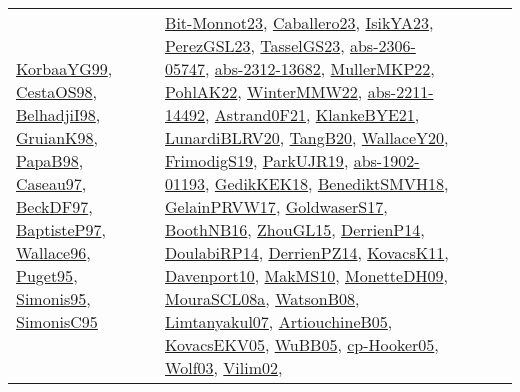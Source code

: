 {\begin{longtable}{lp{3cm}>{\raggedright}p{6cm}>{\raggedright}p{6cm}p{8cm}}
\href{papers/KorbaaYG99.pdf}{KorbaaYG99}\cite{KorbaaYG99}, \href{papers/CestaOS98.pdf}{CestaOS98}\cite{CestaOS98}, \href{articles/BelhadjiI98.pdf}{BelhadjiI98}\cite{BelhadjiI98}, \href{papers/GruianK98.pdf}{GruianK98}\cite{GruianK98}, \href{articles/PapaB98.pdf}{PapaB98}\cite{PapaB98}, \href{papers/Caseau97.pdf}{Caseau97}\cite{Caseau97}, \href{papers/BeckDF97.pdf}{BeckDF97}\cite{BeckDF97}, \href{papers/BaptisteP97.pdf}{BaptisteP97}\cite{BaptisteP97}, \href{articles/Wallace96.pdf}{Wallace96}\cite{Wallace96}, \href{papers/Puget95.pdf}{Puget95}\cite{Puget95}, \href{papers/Simonis95.pdf}{Simonis95}\cite{Simonis95}, \href{papers/SimonisC95.pdf}{SimonisC95}\cite{SimonisC95} & \href{papers/Bit-Monnot23.pdf}{Bit-Monnot23}\cite{Bit-Monnot23}, \href{articles/Caballero23.pdf}{Caballero23}\cite{Caballero23}, \href{articles/IsikYA23.pdf}{IsikYA23}\cite{IsikYA23}, \href{papers/PerezGSL23.pdf}{PerezGSL23}\cite{PerezGSL23}, \href{papers/TasselGS23.pdf}{TasselGS23}\cite{TasselGS23}, \href{articles/abs-2306-05747.pdf}{abs-2306-05747}\cite{abs-2306-05747}, \href{articles/abs-2312-13682.pdf}{abs-2312-13682}\cite{abs-2312-13682}, \href{articles/MullerMKP22.pdf}{MullerMKP22}\cite{MullerMKP22}, \href{articles/PohlAK22.pdf}{PohlAK22}\cite{PohlAK22}, \href{papers/WinterMMW22.pdf}{WinterMMW22}\cite{WinterMMW22}, \href{articles/abs-2211-14492.pdf}{abs-2211-14492}\cite{abs-2211-14492}, \href{papers/Astrand0F21.pdf}{Astrand0F21}\cite{Astrand0F21}, \href{papers/KlankeBYE21.pdf}{KlankeBYE21}\cite{KlankeBYE21}, \href{articles/LunardiBLRV20.pdf}{LunardiBLRV20}\cite{LunardiBLRV20}, \href{papers/TangB20.pdf}{TangB20}\cite{TangB20}, \href{articles/WallaceY20.pdf}{WallaceY20}\cite{WallaceY20}, \href{papers/FrimodigS19.pdf}{FrimodigS19}\cite{FrimodigS19}, \href{papers/ParkUJR19.pdf}{ParkUJR19}\cite{ParkUJR19}, \href{articles/abs-1902-01193.pdf}{abs-1902-01193}\cite{abs-1902-01193}, \href{articles/GedikKEK18.pdf}{GedikKEK18}\cite{GedikKEK18}, \href{papers/BenediktSMVH18.pdf}{BenediktSMVH18}\cite{BenediktSMVH18}, \href{papers/GelainPRVW17.pdf}{GelainPRVW17}\cite{GelainPRVW17}, \href{papers/GoldwaserS17.pdf}{GoldwaserS17}\cite{GoldwaserS17}, \href{papers/BoothNB16.pdf}{BoothNB16}\cite{BoothNB16}, \href{papers/ZhouGL15.pdf}{ZhouGL15}\cite{ZhouGL15}, \href{papers/DerrienP14.pdf}{DerrienP14}\cite{DerrienP14}, \href{papers/DoulabiRP14.pdf}{DoulabiRP14}\cite{DoulabiRP14}, \href{papers/DerrienPZ14.pdf}{DerrienPZ14}\cite{DerrienPZ14}, \href{articles/KovacsK11.pdf}{KovacsK11}\cite{KovacsK11}, \href{papers/Davenport10.pdf}{Davenport10}\cite{Davenport10}, \href{papers/MakMS10.pdf}{MakMS10}\cite{MakMS10}, \href{papers/MonetteDH09.pdf}{MonetteDH09}\cite{MonetteDH09}, \href{papers/MouraSCL08a.pdf}{MouraSCL08a}\cite{MouraSCL08a}, \href{papers/WatsonB08.pdf}{WatsonB08}\cite{WatsonB08}, \href{papers/Limtanyakul07.pdf}{Limtanyakul07}\cite{Limtanyakul07}, \href{papers/ArtiouchineB05.pdf}{ArtiouchineB05}\cite{ArtiouchineB05}, \href{papers/KovacsEKV05.pdf}{KovacsEKV05}\cite{KovacsEKV05}, \href{papers/WuBB05.pdf}{WuBB05}\cite{WuBB05}, \href{papers/cp-Hooker05.pdf}{cp-Hooker05}\cite{cp-Hooker05}, \href{papers/Wolf03.pdf}{Wolf03}\cite{Wolf03}, \href{papers/Vilim02.pdf}{Vilim02}\cite{Vilim02}, 
\end{longtable}}
